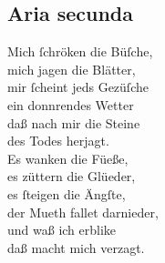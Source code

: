 \documentclass{ees}
\newenvironment{lyrics}[1]{%
  \subsection{#1}\nopagebreak%
  \begin{lyricslist}%
  \let\voice\item%
}{%
  \end{lyricslist}%
}
\begin{document}
\begin{lyrics}{Aria secunda}
  \voice[Sisera]
  Mich ſchröken die Büſche,\\
  mich jagen die Blätter,\\
  mir ſcheint jeds Gezüſche\\
  ein donnrendes Wetter\\
  daß nach mir die Steine\\
  des Todes herjagt.\\[1ex]
  Es wanken die Füeße,\\
  es züttern die Glüeder,\\
  es ſteigen die Ängſte,\\
  der Mueth fallet darnieder,\\
  und waß ich erblike\\
  daß macht mich verzagt.
\end{lyrics}
\end{document}
